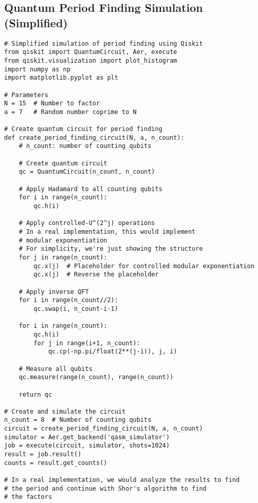 \documentclass{article}
\begin{document}
\subsection{Quantum Period Finding Simulation (Simplified)}
\begin{lstlisting}
# Simplified simulation of period finding using Qiskit
from qiskit import QuantumCircuit, Aer, execute
from qiskit.visualization import plot_histogram
import numpy as np
import matplotlib.pyplot as plt

# Parameters
N = 15  # Number to factor
a = 7   # Random number coprime to N

# Create quantum circuit for period finding
def create_period_finding_circuit(N, a, n_count):
    # n_count: number of counting qubits
    
    # Create quantum circuit
    qc = QuantumCircuit(n_count, n_count)
    
    # Apply Hadamard to all counting qubits
    for i in range(n_count):
        qc.h(i)
    
    # Apply controlled-U^(2^j) operations
    # In a real implementation, this would implement 
    # modular exponentiation
    # For simplicity, we're just showing the structure
    for j in range(n_count):
        qc.x(j)  # Placeholder for controlled modular exponentiation
        qc.x(j)  # Reverse the placeholder
    
    # Apply inverse QFT
    for i in range(n_count//2):
        qc.swap(i, n_count-i-1)
    
    for i in range(n_count):
        qc.h(i)
        for j in range(i+1, n_count):
            qc.cp(-np.pi/float(2**(j-i)), j, i)
    
    # Measure all qubits
    qc.measure(range(n_count), range(n_count))
    
    return qc

# Create and simulate the circuit
n_count = 8  # Number of counting qubits
circuit = create_period_finding_circuit(N, a, n_count)
simulator = Aer.get_backend('qasm_simulator')
job = execute(circuit, simulator, shots=1024)
result = job.result()
counts = result.get_counts()

# In a real implementation, we would analyze the results to find 
# the period and continue with Shor's algorithm to find 
# the factors
\end{lstlisting}
\end{document}
